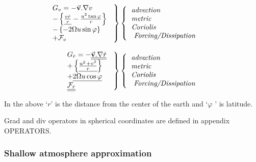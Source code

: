 \begin{equation}
\left. 
\begin{tabular}{l}
$G_{v}=-\vec{\mathbf{v}}.\nabla v$ \\ 
$-\left\{ \underline{\frac{v\dot{r}}{{r}}}-\frac{u^{2}\tan \varphi}{{r}}\right\} 
$ \\ 
$-\left\{ -2\Omega u\sin \varphi \right\} $ \\ 
$+\mathcal{F}_{v}$
\end{tabular}
\ \right\} \left\{ 
\begin{tabular}{l}
\textit{advection} \\ 
\textit{metric} \\ 
\textit{Coriolis} \\ 
\textit{\ Forcing/Dissipation}
\end{tabular}
\ \right. \qquad  \label{eq:gv-spherical}
\end{equation}
\qquad \qquad \qquad \qquad \qquad

\begin{equation}
\left. 
\begin{tabular}{l}
$G_{\dot{r}}=-\underline{\underline{\vec{\mathbf{v}}.\nabla \dot{r}}}$ \\ 
$+\left\{ \underline{\frac{u^{_{^{2}}}+v^{2}}{{r}}}\right\} $ \\ 
${+}\underline{{2\Omega u\cos \varphi}}$ \\ 
$\underline{\underline{\mathcal{F}_{\dot{r}}}}$
\end{tabular}
\ \right\} \left\{ 
\begin{tabular}{l}
\textit{advection} \\ 
\textit{metric} \\ 
\textit{Coriolis} \\ 
\textit{\ Forcing/Dissipation}
\end{tabular}
\ \right.  \label{eq:gw-spherical}
\end{equation}
\qquad \qquad \qquad \qquad \qquad

In the above `${r}$' is the distance from the center of the earth and `$\varphi$
' is latitude.

Grad and div operators in spherical coordinates are defined in appendix
OPERATORS.



\subsubsection{Shallow atmosphere approximation}

